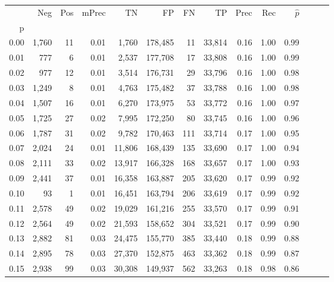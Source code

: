 \begin{tabular}{rrrrrrrrrrrrrr}
\toprule
{} &    Neg &  Pos & mPrec &       TN &       FP &      FN &      TP &  Prec &   Rec & $\hat{p}$ \\
p    &        &      &       &          &          &         &         &       &       &           \\
\midrule
0.00 &  1,760 &   11 &  0.01 &    1,760 &  178,485 &      11 &  33,814 &  0.16 &  1.00 &      0.99 \\
0.01 &    777 &    6 &  0.01 &    2,537 &  177,708 &      17 &  33,808 &  0.16 &  1.00 &      0.99 \\
0.02 &    977 &   12 &  0.01 &    3,514 &  176,731 &      29 &  33,796 &  0.16 &  1.00 &      0.98 \\
0.03 &  1,249 &    8 &  0.01 &    4,763 &  175,482 &      37 &  33,788 &  0.16 &  1.00 &      0.98 \\
0.04 &  1,507 &   16 &  0.01 &    6,270 &  173,975 &      53 &  33,772 &  0.16 &  1.00 &      0.97 \\
0.05 &  1,725 &   27 &  0.02 &    7,995 &  172,250 &      80 &  33,745 &  0.16 &  1.00 &      0.96 \\
0.06 &  1,787 &   31 &  0.02 &    9,782 &  170,463 &     111 &  33,714 &  0.17 &  1.00 &      0.95 \\
0.07 &  2,024 &   24 &  0.01 &   11,806 &  168,439 &     135 &  33,690 &  0.17 &  1.00 &      0.94 \\
0.08 &  2,111 &   33 &  0.02 &   13,917 &  166,328 &     168 &  33,657 &  0.17 &  1.00 &      0.93 \\
0.09 &  2,441 &   37 &  0.01 &   16,358 &  163,887 &     205 &  33,620 &  0.17 &  0.99 &      0.92 \\
0.10 &     93 &    1 &  0.01 &   16,451 &  163,794 &     206 &  33,619 &  0.17 &  0.99 &      0.92 \\
0.11 &  2,578 &   49 &  0.02 &   19,029 &  161,216 &     255 &  33,570 &  0.17 &  0.99 &      0.91 \\
0.12 &  2,564 &   49 &  0.02 &   21,593 &  158,652 &     304 &  33,521 &  0.17 &  0.99 &      0.90 \\
0.13 &  2,882 &   81 &  0.03 &   24,475 &  155,770 &     385 &  33,440 &  0.18 &  0.99 &      0.88 \\
0.14 &  2,895 &   78 &  0.03 &   27,370 &  152,875 &     463 &  33,362 &  0.18 &  0.99 &      0.87 \\
0.15 &  2,938 &   99 &  0.03 &   30,308 &  149,937 &     562 &  33,263 &  0.18 &  0.98 &      0.86 \\

\end{tabular}
